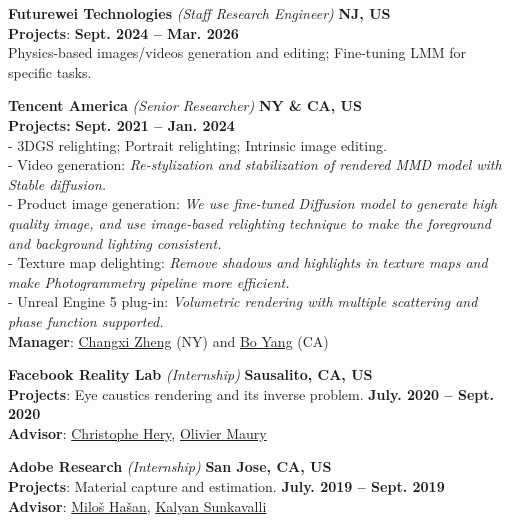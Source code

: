 \documentclass[margin,line]{resume}
\begin{document}
\begin{resume}
	\textbf{Futurewei Technologies} \textsl{(Staff Research Engineer)} \hfill \textbf{NJ, US} \\
	\textbf{Projects}:  \hfill \textbf{Sept. 2024 -- Mar. 2026} \\
	Physics-based images/videos generation and editing; Fine-tuning LMM for specific tasks.
	
	\vspace{0.0mm}
	
	\textbf{Tencent America} \textsl{(Senior Researcher)} \hfill \textbf{NY \& CA, US} \\
	\textbf{Projects:} \hfill \textbf{Sept. 2021 -- Jan. 2024} \\
	- 3DGS relighting; Portrait relighting; Intrinsic image editing.  \\
	- Video generation: \textsl{Re-stylization and stabilization of rendered MMD model with Stable diffusion.} \\
	- Product image generation: \textsl{We use fine-tuned Diffusion model to generate high quality image, and use image-based relighting technique to make the foreground and background lighting consistent.} \\
	- Texture map delighting: \textsl{Remove shadows and highlights in texture maps and make Photogrammetry pipeline more efficient.} \\
	- Unreal Engine 5 plug-in: \textsl{Volumetric rendering with multiple scattering and phase function supported.} \\
	\textbf{Manager}: \href{https://www.cs.columbia.edu/~cxz/}{Changxi Zheng} (NY) and  \href{https://sites.google.com/site/boyanghome/home}{Bo Yang} (CA)
	
	\vspace{0.0mm}

	\textbf{Facebook Reality Lab} \textsl{(Internship)} \hfill \textbf{Sausalito, CA, US} \\
	\textbf{Projects}: Eye caustics rendering and its inverse problem. \hfill \textbf{July. 2020 -- Sept. 2020}\\
	\textbf{Advisor}: \href{https://graphics.pixar.com/library/indexAuthorChristophe_Hery.html}{Christophe Hery}, \href{https://www.imdb.com/name/nm1436524/}{Olivier Maury}       

    \vspace{0.0mm}

	\textbf{Adobe Research} \textsl{(Internship)} \hfill \textbf{San Jose, CA, US} \\
	\textbf{Projects}: Material capture and estimation. \hfill \textbf{July. 2019 -- Sept. 2019}\\
	\textbf{Advisor}: \href{http://miloshasan.net/}{Milo\v{s} Ha\v{s}an}, \href{https://research.adobe.com/person/kalyan-sunkavalli/}{Kalyan Sunkavalli}       


\end{resume}
\end{document}
